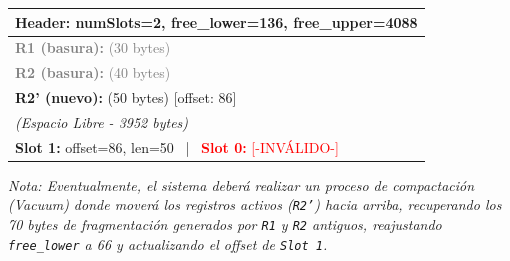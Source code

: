 \documentclass[12pt,a4paper]{article}
\begin{document}
\begin{center}
\begin{tabular}{|p{10cm}|}
\hline
\textbf{Header:} numSlots=2, free\_lower=136, free\_upper=4088 \\ \hline
\textcolor{gray}{\textbf{R1 (basura):} (30 bytes)} \\ \hline
\textcolor{gray}{\textbf{R2 (basura):} (40 bytes)} \\ \hline
\textbf{R2' (nuevo):} (50 bytes) [offset: 86] \\ \hline
\textit{(Espacio Libre - 3952 bytes)} \\ \hline
\textbf{Slot 1:} offset=86, len=50 ~|~ \textcolor{red}{\textbf{Slot 0:} [-INVÁLIDO-]} \\ \hline
\end{tabular}
\end{center}

\textit{Nota: Eventualmente, el sistema deberá realizar un proceso de compactación (Vacuum) donde moverá los registros activos (\texttt{R2'}) hacia arriba, recuperando los 70 bytes de fragmentación generados por \texttt{R1} y \texttt{R2} antiguos, reajustando \texttt{free\_lower} a 66 y actualizando el offset de \texttt{Slot 1}.}
\end{document}
